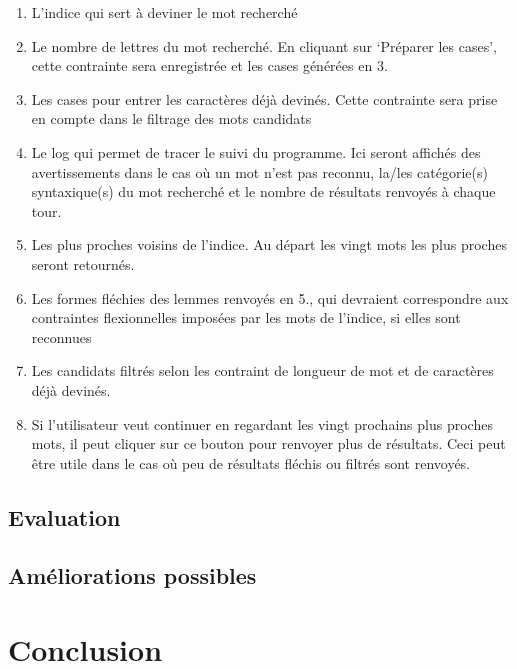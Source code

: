 \documentclass[a4paper, 12pt]{article}
\begin{document}
\begin{enumerate}
    \item{L'indice qui sert à deviner le mot recherché}
    \item{Le nombre de lettres du mot recherché. En cliquant sur \lq{Préparer les cases}\rq, cette contrainte sera enregistrée et les cases générées en 3.}
    \item{Les cases pour entrer les caractères déjà devinés. Cette contrainte sera prise en compte dans le filtrage des mots candidats}
    \item{Le log qui permet de tracer le suivi du programme. Ici seront affichés des avertissements dans le cas où un mot n'est pas reconnu, la/les catégorie(s) syntaxique(s) du mot recherché et le nombre de résultats renvoyés à chaque tour.}
    \item{Les plus proches voisins de l'indice. Au départ les vingt mots les plus proches seront retournés.}
    \item{Les formes fléchies des lemmes renvoyés en 5., qui devraient correspondre aux contraintes flexionnelles imposées par les mots de l'indice, si elles sont reconnues}
    \item{Les candidats filtrés selon les contraint de longueur de mot et de caractères déjà devinés.}
    \item{Si l'utilisateur veut continuer en regardant les vingt prochains plus proches mots, il peut cliquer sur ce bouton pour renvoyer plus de résultats. Ceci peut être utile dans le cas où peu de résultats fléchis ou filtrés sont renvoyés.}
    
\end{enumerate}


\subsection{Evaluation}

\subsection{Améliorations possibles}

\section{Conclusion}
\end{document}
